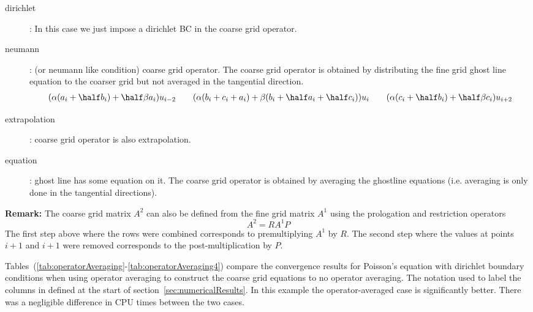 \documentclass{article}
\begin{document}
\begin{description}
  \item[dirichlet] : In this case we just impose a dirichlet BC in the coarse grid operator.
  \item[neumann] : (or neumann like condition) coarse grid operator. The coarse grid operator is
     obtained by distributing the fine grid ghost line equation to the coarser grid but not averaged
     in the tangential direction.
\[
   \begin{matrix}
     ( \alpha(a_{i}+\half b_{i}) +\half\beta a_i) u_{i-2} & 
         &
         (\alpha( b_i + c_i + a_i) + \beta (b_i+\half a_i+\half c_i) ) u_i &
         &
     (\alpha( c_i + \half b_i) + \half\beta c_i)u_{i+2} 
    \end{matrix}
\]
  \item[extrapolation] : coarse grid operator is also extrapolation.
  \item[equation] : ghost line has some equation on it. The coarse grid operator is obtained by
       averaging the ghostline equations (i.e. averaging is only done in the tangential directions).
\end{description}






{\bf Remark:} 
The coarse grid matrix $A^{2}$ can also be defined from the fine grid matrix $A^1$ using the prologation
and restriction operators
\[
     A^2 = R A^1 P
\]
The first step above where the rows were combined corresponds to premultiplying $A^1$
by $R$.
The second step where the values at points $i+1$ and $i+1$ were removed corresponds to the post-multiplication
by $P$.

Tables~(\ref{tab:operatorAveraging}-\ref{tab:operatorAveraging4}) 
compare the convergence results for Poisson's equation with 
dirichlet boundary conditions when using operator averaging to construct the coarse grid equations
to no operator averaging. The notation used to label the columns in defined 
at the start of section~\ref{sec:numericalResults}.
In this example the operator-averaged case is significantly better.
There was a negligible difference in CPU times between the two cases.
\end{document}
